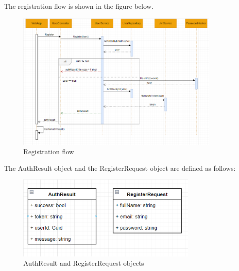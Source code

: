 The registration flow is shown in the figure below.
\begin{figure}[H]
    \centering
    \includegraphics[width=0.9\textwidth]{images/registration-flow.png}
    \caption{Registration flow}
    \label{fig:registration-flow}
\end{figure}

The AuthResult object and the RegisterRequest object are defined as follows:
\begin{figure}[H]
    \centering
    \includegraphics[width=0.8\textwidth]{images/auth-request.png}
    \caption{AuthResult and RegisterRequest objects}
    \label{fig:auth-result}
\end{figure}


